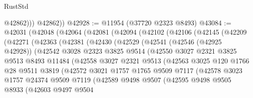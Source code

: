 \begin{lexlean}{RustStd}
\begin{coremodule}
              @42862)))
        @42862))
@42928 := @11954 (@37720 @2323 @8493)
@43084 := @42031
    (@42048
      (@42064
        (@42081
          (@42094
            (@42102
              (@42106
                (@42145
                  (@42209
                    (@42271
                      (@42363
                        (@42381
                          (@42430
                            (@42529
                              (@42541
                                (@42546 (@42925 @42928))
                                (@42542
                                  @3028
                                  @2323
                                  @3825
                                  @9514
                                  (@42550
                                    @3027
                                    @2321
                                    @3825
                                    @9513
                                    @8493
                                    @11484
                                    (@42558
                                      @3027
                                      @2321
                                      @9513
                                      (@42563
                                        @3025
                                        @120
                                        @1766
                                        @28
                                        @9511
                                        @3819
                                        (@42572
                                          @3021
                                          @1757
                                          @1765
                                          @9509
                                          @7117
                                          (@42578
                                            @3023
                                            @1757
                                            @24374
                                            @9509
                                            @7119
                                            (@42589
                                              @9498
                                              @9507
                                              (@42595
                                                @9498
                                                @9505
                                                @8933
                                                (@42603
                                                  @9497
                                                  @9504

\end{coremodule}
\end{lexlean}
